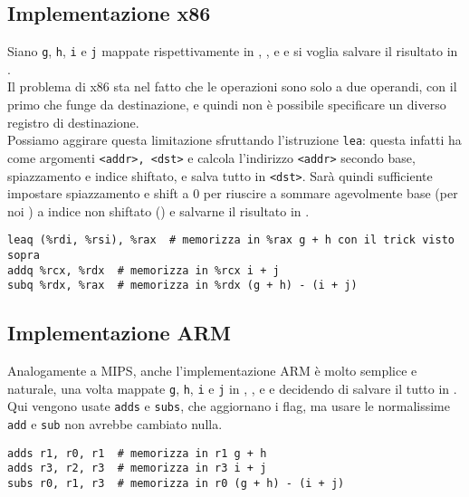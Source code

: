 \documentclass[class=book, crop=false, oneside]{standalone}
\begin{document}
\subsection*{Implementazione x86}
Siano \texttt{g}, \texttt{h}, \texttt{i} e \texttt{j} mappate rispettivamente in , ,  e  e si voglia salvare il risultato in .\\
Il problema di x86 sta nel fatto che le operazioni sono solo a due operandi, con il primo che funge da destinazione, e quindi non è possibile specificare un diverso registro di destinazione.\\
Possiamo aggirare questa limitazione sfruttando l'istruzione \texttt{lea}: questa infatti ha come argomenti \texttt{<addr>, <dst>} e calcola l'indirizzo \texttt{<addr>} secondo base, spiazzamento e indice shiftato, e salva tutto in \texttt{<dst>}. Sarà quindi sufficiente impostare spiazzamento e shift a 0 per riuscire a sommare agevolmente base (per noi ) a indice non shiftato () e salvarne il risultato in .
\begin{verbatim}
leaq (%rdi, %rsi), %rax  # memorizza in %rax g + h con il trick visto sopra
addq %rcx, %rdx  # memorizza in %rcx i + j
subq %rdx, %rax  # memorizza in %rdx (g + h) - (i + j)
\end{verbatim}

\subsection*{Implementazione ARM}
Analogamente a MIPS, anche l'implementazione ARM è molto semplice e naturale, una volta mappate \texttt{g}, \texttt{h}, \texttt{i} e \texttt{j} in , ,  e  e decidendo di salvare il tutto in .\\
Qui vengono usate \texttt{adds} e \texttt{subs}, che aggiornano i flag, ma usare le normalissime \texttt{add} e \texttt{sub} non avrebbe cambiato nulla.
\begin{verbatim}
adds r1, r0, r1  # memorizza in r1 g + h
adds r3, r2, r3  # memorizza in r3 i + j
subs r0, r1, r3  # memorizza in r0 (g + h) - (i + j)
\end{verbatim}
\end{document}

